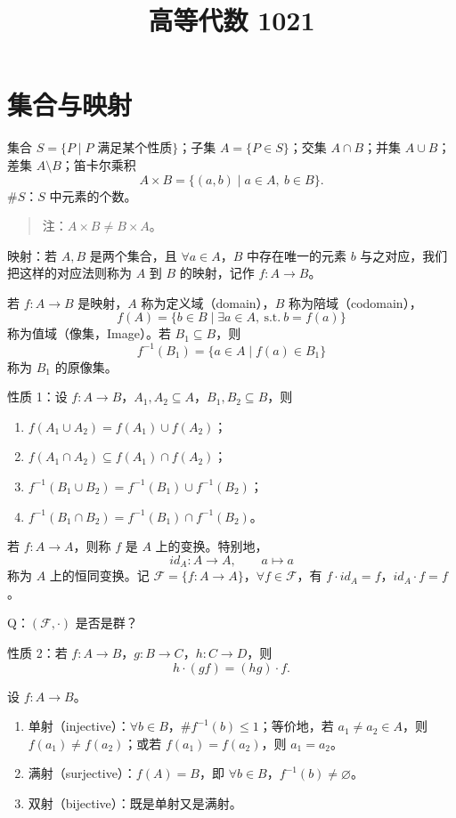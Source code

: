 \documentclass[UTF8,11pt]{ctexart}
\title{高等代数 1021}
\date{}
\theoremstyle{cnthm}
\begin{document}
\maketitle

\section{集合与映射}

集合 $S=\{P\mid P\text{ 满足某个性质}\}$；子集 $A=\{P\in S\}$；交集 $A\cap B$；并集 $A\cup B$；差集 $A\setminus B$；笛卡尔乘积
\[
A\times B=\{(a,b)\mid a\in A,\ b\in B\}.
\]
$\#S$：$S$ 中元素的个数。

\begin{quote}
注：$A\times B\neq B\times A$。
\end{quote}

映射：若 $A,B$ 是两个集合，且 $\forall a\in A$，$B$ 中存在唯一的元素 $b$ 与之对应，我们把这样的对应法则称为 $A$ 到 $B$ 的映射，记作 $f:A\to B$。

若 $f:A\to B$ 是映射，$A$ 称为定义域（domain），$B$ 称为陪域（codomain），
\[
f(A)=\{b\in B\mid \exists a\in A,\ \text{s.t.}\ b=f(a)\}
\]
称为值域（像集，Image）。若 $B_1\subseteq B$，则
\[
f^{-1}(B_1)=\{a\in A\mid f(a)\in B_1\}
\]
称为 $B_1$ 的原像集。

性质 1：设 $f:A\to B$，$A_1,A_2\subseteq A$，$B_1,B_2\subseteq B$，则
\begin{enumerate}
\item $f(A_1\cup A_2)=f(A_1)\cup f(A_2)$；
\item $f(A_1\cap A_2)\subseteq f(A_1)\cap f(A_2)$；
\item $f^{-1}(B_1\cup B_2)=f^{-1}(B_1)\cup f^{-1}(B_2)$；
\item $f^{-1}(B_1\cap B_2)=f^{-1}(B_1)\cap f^{-1}(B_2)$。
\end{enumerate}

若 $f:A\to A$，则称 $f$ 是 $A$ 上的变换。特别地，
\[
id_A:A\to A,\qquad a\mapsto a
\]
称为 $A$ 上的恒同变换。记 $\mathcal{F}=\{f:A\to A\}$，$\forall f\in\mathcal{F}$，有 $f\cdot id_A=f$，$id_A\cdot f=f$。

Q：$(\mathcal{F},\cdot)$ 是否是群？

性质 2：若 $f:A\to B$，$g:B\to C$，$h:C\to D$，则
\[
h\cdot(gf)=(hg)\cdot f.
\]

设 $f:A\to B$。
\begin{enumerate}
\item 单射（injective）：$\forall b\in B$，$\#f^{-1}(b)\le 1$；等价地，若 $a_1\neq a_2\in A$，则 $f(a_1)\neq f(a_2)$；或若 $f(a_1)=f(a_2)$，则 $a_1=a_2$。
\item 满射（surjective）：$f(A)=B$，即 $\forall b\in B$，$f^{-1}(b)\neq\varnothing$。
\item 双射（bijective）：既是单射又是满射。
\end{enumerate}
\end{document}
